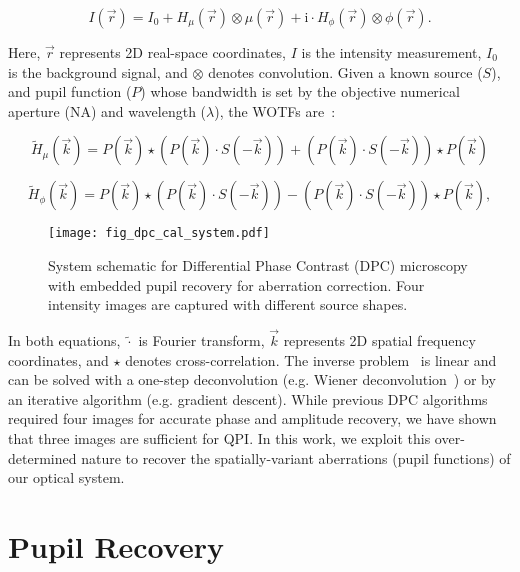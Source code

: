 \begin{equation}
	I(\vec{r}) = I_{0} +H_{\mu}(\vec{r}) \otimes \mu(\vec{r}) + \mathrm{i}\cdot H_{\phi}(\vec{r}) \otimes \phi(\vec{r}).
	\label{eq:two}
\end{equation}

\noindent Here, $\vec{r}$ represents 2D real-space coordinates, $I$ is the intensity measurement, $I_0$ is the background signal, and $\otimes$ denotes convolution. Given a known source ($S$), and pupil function ($P$) whose bandwidth is set by the objective numerical aperture (NA) and wavelength ($\lambda$), the WOTFs are~\cite{Claus2015,tian2015quantitative}:

\begin{equation}\label{WOTFre}
\tilde{H}_{\mu}(\vec{k}) = P(\vec{k}) \star (P(\vec{k})\cdot S(-\vec{k}))+ (P(\vec{k}) \cdot S(-\vec{k})) \star P(\vec{k})
\end{equation}

\begin{equation}\label{WOTFim}
\tilde{H}_{\phi} (\vec{k}) = P(\vec{k}) \star (P(\vec{k})\cdot S(-\vec{k}))- (P(\vec{k}) \cdot S(-\vec{k})) \star P(\vec{k}),
\end{equation}

\begin{figure}
\centering
\texttt{[image: fig\_dpc\_cal\_system.pdf]}
\caption{\label{fig:system}
System schematic for Differential Phase Contrast (DPC) microscopy with embedded pupil recovery for aberration correction. Four intensity images are captured with different source shapes.}
\end{figure}

\noindent In both equations, $\tilde{\cdot}$ is Fourier transform, $\vec{k}$ represents 2D spatial frequency coordinates, and $\star$ denotes cross-correlation. The inverse problem~\cite{tian2015quantitative,Claus2015} is linear and can be solved with a one-step deconvolution (e.g. Wiener deconvolution~\cite{HayesDSP}) or by an iterative algorithm (e.g. gradient descent). While previous DPC algorithms~\cite{tian2015quantitative} required four images for accurate phase and amplitude recovery, we have shown~\cite{PhillipsChen17cDPC} that three images are sufficient for QPI. In this work, we exploit this over-determined nature to recover the spatially-variant aberrations (pupil functions) of our optical system.

\section{Pupil Recovery}


